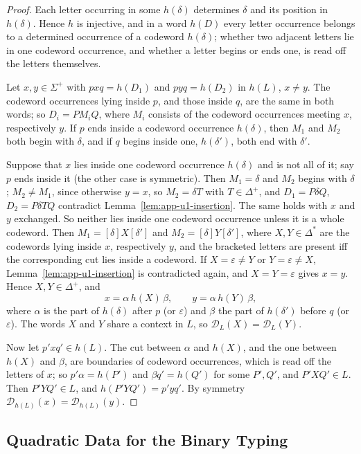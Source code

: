 \documentclass[11pt]{article}
\numberwithin{equation}{section}
\theoremstyle{plain}
\theoremstyle{definition}
\theoremstyle{remark}
\newcommand{\D}{\mathcal{D}}
\newcommand{\eps}{\varepsilon}
\theoremstyle{plain}
\begin{document}
\begin{proof}
Each letter occurring in some $h(\delta)$ determines $\delta$ and its position in
$h(\delta)$.  Hence $h$ is injective, and in a word $h(D)$ every letter occurrence
belongs to a determined occurrence of a codeword $h(\delta)$; whether two adjacent
letters lie in one codeword occurrence, and whether a letter begins or ends one,
is read off the letters themselves.

Let $x,y\in\Sigma^+$ with $pxq=h(D_1)$ and $pyq=h(D_2)$ in $h(L)$, $x\ne y$.  The
codeword occurrences lying inside $p$, and those inside $q$, are the same in both
words; so $D_i=PM_iQ$, where $M_i$ consists of the codeword occurrences meeting
$x$, respectively $y$.  If $p$ ends inside a codeword occurrence $h(\delta)$, then
$M_1$ and $M_2$ both begin with $\delta$, and if $q$ begins inside one,
$h(\delta')$, both end with $\delta'$.

Suppose that $x$ lies inside one codeword occurrence $h(\delta)$ and is not all
of it; say $p$ ends inside it (the other case is symmetric).  Then $M_1=\delta$
and $M_2$ begins with $\delta$; $M_2\ne M_1$, since otherwise $y=x$, so
$M_2=\delta T$ with $T\in\Delta^+$, and $D_1=P\delta Q$, $D_2=P\delta TQ$ contradict
Lemma~\ref{lem:app-u1-insertion}.  The
same holds with $x$ and $y$ exchanged.  So neither lies inside one codeword
occurrence unless it is a whole codeword.  Then $M_1=[\delta]X[\delta']$ and
$M_2=[\delta]Y[\delta']$, where $X,Y\in\Delta^*$ are the codewords lying inside $x$,
respectively $y$, and the bracketed letters are present iff the corresponding
cut lies inside a codeword.  If $X=\eps\ne Y$ or $Y=\eps\ne X$,
Lemma~\ref{lem:app-u1-insertion} is contradicted again, and $X=Y=\eps$ gives
$x=y$.  Hence $X,Y\in\Delta^+$, and
\[
 x=\alpha\,h(X)\,\beta,\qquad y=\alpha\,h(Y)\,\beta,
\]
where $\alpha$ is the part of $h(\delta)$ after $p$ (or $\eps$) and $\beta$ the
part of $h(\delta')$ before $q$ (or $\eps$).  The words $X$ and $Y$ share a context
in $L$, so $\D_L(X)=\D_L(Y)$.

Now let $p'xq'\in h(L)$.  The cut between $\alpha$ and $h(X)$, and the one between
$h(X)$ and $\beta$, are boundaries of codeword occurrences, which is read off the
letters of $x$; so $p'\alpha=h(P')$ and $\beta q'=h(Q')$ for some $P',Q'$, and
$P'XQ'\in L$.  Then $P'YQ'\in L$, and $h(P'YQ')=p'yq'$.  By symmetry
$\D_{h(L)}(x)=\D_{h(L)}(y)$.
\end{proof}


\subsection{Quadratic Data for the Binary Typing}
\end{document}
